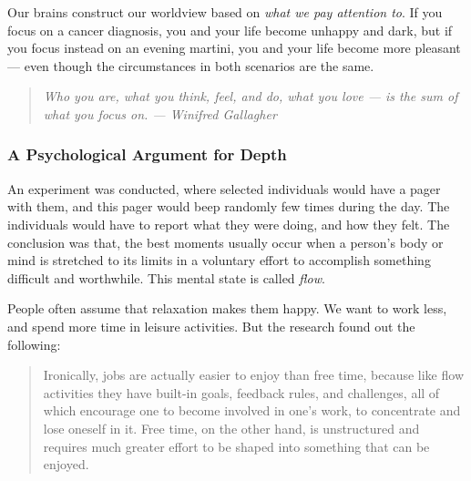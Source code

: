 \documentclass[12pt, letterpaper]{article}
\begin{document}
Our brains construct our worldview based on \emph{what we pay attention to}. If you focus on a cancer diagnosis, you and your life become unhappy and dark, but if you focus instead on an evening martini, you and your life become more pleasant --- even though the circumstances in both scenarios are the same.

\begin{quote}
    \emph{Who you are, what you think, feel, and do, what you love --- is the sum of what you focus on. --- Winifred Gallagher}
\end{quote}

\subsubsection*{A Psychological Argument for Depth}

An experiment was conducted, where selected individuals would have a pager with them, and this pager would beep randomly few times during the day. The individuals would have to report what they were doing, and how they felt. The conclusion was that, the best moments usually occur when a person's body or mind is stretched to its limits in a voluntary effort to accomplish something difficult and worthwhile. This mental state is called \emph{flow}.

People often assume that relaxation makes them happy. We want to work less, and spend more time in leisure activities. But the research found out the following:

\begin{quote}
    Ironically, jobs are actually easier to enjoy than free time, because like flow activities they have built-in goals, feedback rules, and challenges, all of which encourage one to become involved in one's work, to concentrate and lose oneself in it. Free time, on the other hand, is unstructured and requires much greater effort to be shaped into something that can be enjoyed.
\end{quote}
\end{document}
